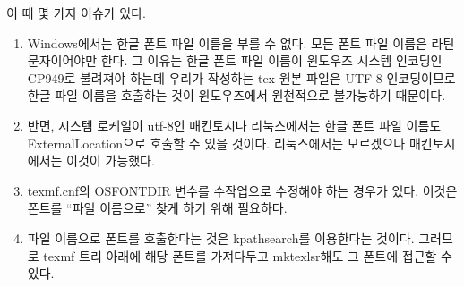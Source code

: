 \documentclass[
	12pt,
	a4paper,
	kosection,
	footnote,
	nobookmarks,
	microtype,
]{oblivoir}
\def\myLabel#1#2{\label{#1}}
\def\myLabel#1#2{\label{#2}}
\begin{document}
이 때 몇 가지 이슈가 있다.
\begin{enumerate}[(가)]\tightlist
\item Windows에서는 한글 폰트 파일 이름을 부를 수 없다. 모든 폰트 파일 이름은
라틴 문자이어야만 한다. 그 이유는 한글 폰트 파일 이름이 윈도우즈 시스템 인코딩인
CP949로 불려져야 하는데 우리가 작성하는 tex 원본 파일은 UTF-8 인코딩이므로
한글 파일 이름을 호출하는 것이 윈도우즈에서 원천적으로 불가능하기 때문이다.

\item 반면, 시스템 로케일이 utf-8인 매킨토시나 리눅스에서는 한글 폰트 파일 이름도
ExternalLocation으로 호출할 수 있을 것이다. 리눅스에서는 모르겠으나 매킨토시에서는
이것이 가능했다.

\item texmf.cnf의 OSFONTDIR 변수를 수작업으로 수정해야 하는 경우가 있다. 
이것은 폰트를 ``파일 이름으로'' 찾게 하기 위해 필요하다.

\item 파일 이름으로 폰트를 호출한다는 것은 kpathsearch를 이용한다는
것이다. 그러므로 texmf 트리 아래에 해당 폰트를 가져다두고 mktexlsr해도 그
폰트에 접근할 수 있다.

\end{enumerate}


\end{document}
